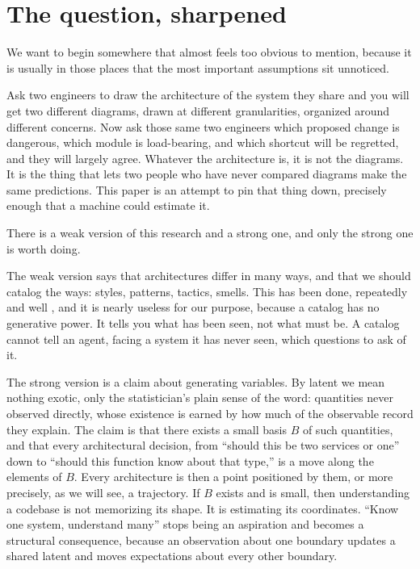 \documentclass[11pt,oneside]{article}
\theoremstyle{definition}
\begin{document}
\section{The question, sharpened}

We want to begin somewhere that almost feels too obvious to mention, because it is usually in
those places that the most important assumptions sit unnoticed.

Ask two engineers to draw the architecture of the system they share and you will get two
different diagrams, drawn at different granularities, organized around different concerns. Now
ask those same two engineers which proposed change is dangerous, which module is load-bearing,
and which shortcut will be regretted, and they will largely agree. Whatever the architecture is,
it is not the diagrams. It is the thing that lets two people who have never compared diagrams
make the same predictions. This paper is an attempt to pin that thing down, precisely enough
that a machine could estimate it.

There is a weak version of this research and a strong one, and only the strong one is worth
doing.

The weak version says that architectures differ in many ways, and that we should catalog the
ways: styles, patterns, tactics, smells. This has been done, repeatedly and well
\cite{shawgarlan1996,gamma1994,bass2012}, and it is nearly useless for our purpose, because a
catalog has no generative power. It tells you what has been seen, not what must be. A catalog
cannot tell an agent, facing a system it has never seen, which questions to ask of it.

The strong version is a claim about generating variables. By latent we mean nothing exotic, only
the statistician's plain sense of the word: quantities never observed directly, whose existence
is earned by how much of the observable record they explain. The claim is that there exists a
small basis $B$ of such quantities, and that every architectural decision, from ``should this be
two services or one'' down to ``should this function know about that type,'' is a move along the
elements of $B$. Every architecture is then a point positioned by them, or more precisely, as we
will see, a trajectory. If $B$ exists and is small, then understanding a codebase is not
memorizing its shape. It is estimating its coordinates. ``Know one system, understand many''
stops being an aspiration and becomes a structural consequence, because an observation about one
boundary updates a shared latent and moves expectations about every other boundary.
\end{document}
